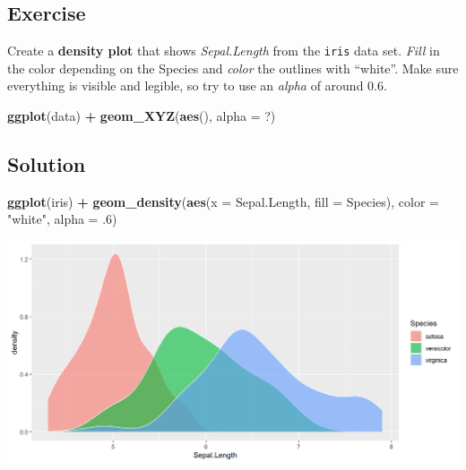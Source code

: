 \documentclass[
]{book}
\newenvironment{Shaded}{\begin{snugshade}}{\end{snugshade}}
\newcommand{\AttributeTok}[1]{\textcolor[rgb]{0.13,0.29,0.53}{#1}}
\newcommand{\DecValTok}[1]{\textcolor[rgb]{0.00,0.00,0.81}{#1}}
\newcommand{\FunctionTok}[1]{\textcolor[rgb]{0.13,0.29,0.53}{\textbf{#1}}}
\newcommand{\NormalTok}[1]{#1}
\newcommand{\SpecialCharTok}[1]{\textcolor[rgb]{0.81,0.36,0.00}{\textbf{#1}}}
\newcommand{\StringTok}[1]{\textcolor[rgb]{0.31,0.60,0.02}{#1}}
\begin{document}
\subsection{Exercise}\label{exercise-1}

Create a \textbf{density plot} that shows \emph{Sepal.Length} from the \texttt{iris} data set.
\emph{Fill} in the color depending on the Species and \emph{color} the outlines with ``white''.
Make sure everything is visible and legible, so try to use an \emph{alpha} of around 0.6.

\begin{Shaded}
\begin{Highlighting}[]
\FunctionTok{ggplot}\NormalTok{(data) }\SpecialCharTok{+} 
  \FunctionTok{geom\_XYZ}\NormalTok{(}\FunctionTok{aes}\NormalTok{(), }\AttributeTok{alpha =}\NormalTok{ ?)}
\end{Highlighting}
\end{Shaded}

\subsection{Solution}\label{solution}

\begin{Shaded}
\begin{Highlighting}[]
\FunctionTok{ggplot}\NormalTok{(iris) }\SpecialCharTok{+} 
  \FunctionTok{geom\_density}\NormalTok{(}\FunctionTok{aes}\NormalTok{(}\AttributeTok{x =}\NormalTok{ Sepal.Length, }\AttributeTok{fill =}\NormalTok{ Species), }
               \AttributeTok{color =} \StringTok{"white"}\NormalTok{, }\AttributeTok{alpha =}\NormalTok{ .}\DecValTok{6}\NormalTok{)}
\end{Highlighting}
\end{Shaded}

\begin{flushleft}\includegraphics{_main_files/figure-html/unnamed-chunk-35-1} \end{flushleft}
\end{document}
